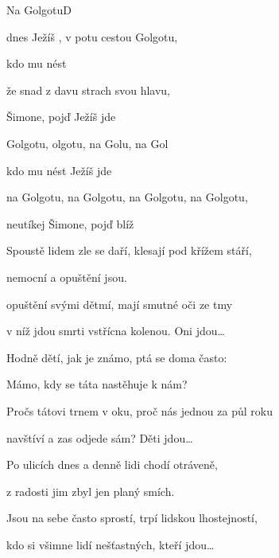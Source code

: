 \begin{song}{Na Golgotu}{D}{}

\begin{SBVerse}

dnes Ježíš , v potu  cestou  Golgotu,

 kdo mu  nést 

 že snad  z davu  strach svou hlavu,

 Šimone, pojď  Ježíš jde

\end{SBVerse}

\begin{SBChorus}

 Golgotu, olgotu, na Golu, na Gol

 kdo mu  nést  Ježíš jde

na Golgotu, na Golgotu, na Golgotu, na Golgotu,

neutíkej Šimone, pojď blíž 

\end{SBChorus}

\begin{SBVerse}

Spoustě lidem zle se daří, klesají pod křížem stáří,

nemocní a opuštění jsou.

opuštění svými dětmí, mají smutné oči ze tmy

v níž jdou smrti vstřícna kolenou. Oni jdou\dots

\end{SBVerse}

\begin{SBVerse}

Hodně dětí, jak je známo, ptá se doma často:

Mámo, kdy se táta nastěhuje k nám?

Pročs tátovi trnem v oku, proč nás jednou za půl roku

navštíví a zas odjede sám? Děti jdou\dots

\end{SBVerse}

\begin{SBVerse}

Po ulicích dnes a denně lidi chodí otráveně,

z radosti jim zbyl jen planý smích.

Jsou na sebe často sprostí, trpí lidskou lhostejností,

kdo si všimne lidí nešťastných, kteří jdou\dots

\end{SBVerse}

\end{song}

\pagebreak


